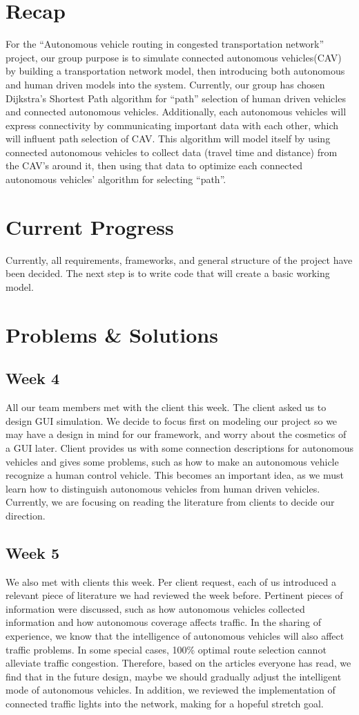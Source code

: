 \documentclass[onecolumn, draftclsnofoot,10pt, compsoc]{IEEEtran}
\begin{document}
\section{Recap}
For the “Autonomous vehicle routing in congested transportation network” project, our group purpose is to simulate connected autonomous vehicles(CAV) by building a transportation network model, then introducing both autonomous and human driven models into the system.
Currently, our group has chosen Dijkstra’s Shortest Path algorithm for “path” selection of human driven vehicles and connected autonomous vehicles.
Additionally, each autonomous vehicles will express connectivity by communicating important data with each other, which will influent path selection of CAV.
This algorithm will model itself by using connected autonomous vehicles to collect data (travel time and distance) from the CAV’s around it, then using that data to optimize each connected autonomous vehicles’ algorithm for selecting “path”.
\section{Current Progress}
Currently, all requirements, frameworks, and general structure of the project have been decided.
The next step is to write code that will create a basic working model.
\section{Problems \& Solutions}
\subsection{Week 4}
All our team members met with the client this week.
The client asked us to design GUI simulation.
We decide to focus first on modeling our project so we may have a design in mind for our framework, and worry about the cosmetics of a GUI later.
Client provides us with some connection descriptions for autonomous vehicles and gives some problems, such as how to make an autonomous vehicle recognize a human control vehicle.
This becomes an important idea, as we must learn how to distinguish autonomous vehicles from human driven vehicles.
Currently, we are focusing on reading the literature from clients to decide our direction.
\subsection{Week 5}
We also met with clients this week.
Per client request, each of us introduced a relevant piece of literature we had reviewed the week before.
Pertinent pieces of information were discussed, such as how autonomous vehicles collected information and how autonomous coverage affects traffic.
In the sharing of experience, we know that the intelligence of autonomous vehicles will also affect traffic problems.
In some special cases, 100\% optimal route selection cannot alleviate traffic congestion.
Therefore, based on the articles everyone has read, we find that in the future design, maybe we should gradually adjust the intelligent mode of autonomous vehicles.
In addition, we reviewed the implementation of connected traffic lights into the network, making for a hopeful stretch goal.
\end{document}
